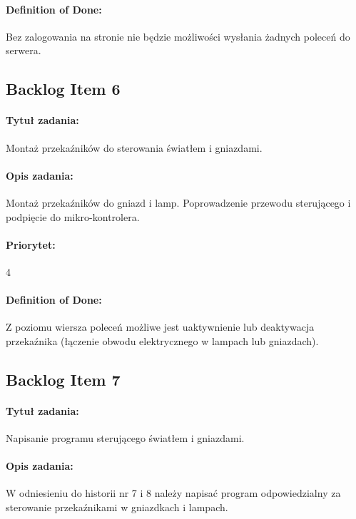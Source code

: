 	\paragraph{Definition of Done:}
	Bez zalogowania na stronie nie będzie możliwości wysłania żadnych poleceń do serwera.

	
	\subsection{Backlog Item 6}
	\paragraph{Tytuł zadania:} 
	Montaż przekaźników do sterowania światłem i gniazdami.
	
	\paragraph{Opis zadania:} 
	Montaż przekaźników do gniazd i lamp. Poprowadzenie przewodu sterującego i podpięcie do mikro-kontrolera.
	
	\paragraph{Priorytet:}
	4
	
	\paragraph{Definition of Done:}
	Z poziomu wiersza poleceń możliwe jest uaktywnienie lub deaktywacja przekaźnika (łączenie obwodu elektrycznego w lampach lub gniazdach).


	\subsection{Backlog Item 7}
	\paragraph{Tytuł zadania:} 
	Napisanie programu sterującego światłem i gniazdami.
	
	\paragraph{Opis zadania:} 
	W odniesieniu do historii nr 7 i 8 należy napisać program odpowiedzialny za sterowanie przekaźnikami w gniazdkach i lampach.
	
